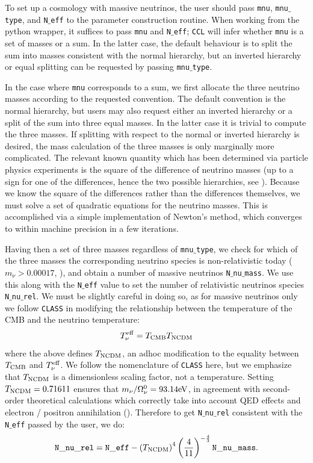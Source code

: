 \documentclass[\docopts]{\docclass}
\newcommand{\ccl}{{\tt CCL}\xspace}
\begin{document}
To set up a cosmology with massive neutrinos, the user should pass {\tt mnu}, {\tt mnu$\_$type}, and {\tt N$\_$eff} to the parameter construction routine. When working from the python wrapper, it suffices to pass {\tt mnu} and {\tt N$\_$eff}; \ccl will infer whether {\tt mnu} is a set of masses or a sum. In the latter case, the default behaviour is to split the sum into masses consistent with the normal hierarchy, but an inverted hierarchy or equal splitting can be requested by passing {\tt mnu$\_$type}.

In the case where {\tt mnu} corresponds to a sum, we first allocate the three neutrino masses according to the requested convention. The default convention is the normal hierarchy, but users may also request either an inverted hierarchy or a split of the sum into three equal masses. In the latter case it is trivial to compute the three masses. If splitting with respect to the normal or inverted hierarchy is desired, the mass calculation of the three masses is only marginally more complicated. The relevant known quantity which has been determined via particle physics experiments is the square of the difference of neutrino masses (up to a sign for one of the differences, hence the two possible hierarchies, see \citealt{Lesgourgues2012, Gerbino2017}). Because we know the square of the differences rather than the differences themselves, we must solve a set of quadratic equations for the neutrino masses. This is accomplished via a simple implementation of Newton's method, which converges to within machine precision in a few iterations.


Having then a set of three masses regardless of {\tt mnu$\_$type}, we check for which of the three masses the corresponding neutrino species is non-relativistic today ($m_\nu>0.00017$, \citealt{Lesgourgues2012}), and obtain a number of massive neutrinos {\tt N$\_$nu$\_$mass}. We use this along with the {\tt N$\_$eff} value to set the number of relativistic neutrinos species {\tt N$\_$nu$\_$rel}. We must be slightly careful in doing so, as for massive neutrinos only we follow {\tt CLASS} in modifying the relationship between the temperature of the CMB and the neutrino temperature:
\begin{equation}
T_{\nu}^{\rm eff} = T_{\rm CMB} T_{\rm NCDM}
\label{Tnueff}
\end{equation}
where the above defines $T_{\rm NCDM}$, an adhoc modification to the equality between $T_{\rm CMB}$ and $T_{\nu}^{\rm eff}$. We follow the nomenclature of {\tt CLASS} here, but we emphasize that $T_{\rm NCDM}$ is a dimensionless scaling factor, not a temperature. Setting $T_{\rm NCDM}=0.71611$ ensures that $m_{\nu} / \Omega_{\nu}^0 = 93.14 {\rm eV}$, in agreement with second-order theoretical calculations which correctly take into account QED effects and electron / positron annihilation (\citealt{Mangano2005}). Therefore to get {\tt N$\_$nu$\_$rel} consistent with the {\tt N$\_$eff} passed by the user, we do:
\begin{equation}
{\tt N\_nu\_rel} = {\tt N\_eff} - \left(T_{\rm NCDM}\right)^{4} \left(\frac{4}{11}\right)^{-\frac{4}{3}} {\tt N\_nu\_mass}.
\label{Nnurel}
\end{equation}
\end{document}
